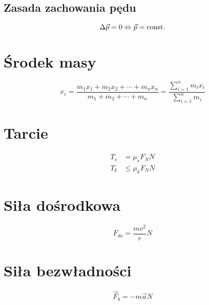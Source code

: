     \subsection{Zasada zachowania pędu}
      \begin{equation}
        \Delta \vec p = 0 \Leftrightarrow \vec p = \operatorname{const.}
      \end{equation}
    \section{Środek masy}
      \begin{equation}
        x_c = \frac{m_1x_1+m_2x_2+\cdots+m_nx_n}{m_1+m_2+\cdots+m_n} =
        \frac{\sum\limits_{i=1}^n m_ix_i}{\sum\limits_{i=1}^n m_i}
      \end{equation}
    \section{Tarcie}
      \begin{align}
        T_s &= \mu_sF_N \unit{N}\\
        T_k &\leqslant \mu_kF_N \unit{N}
      \end{align}
    \section{Siła dośrodkowa}
      \begin{equation}
        F_{do} = \frac{mv^2}{r} \unit{N}
      \end{equation}
      \section{Siła bezwładności}
      \begin{equation}
        \vec F_b = -m\vec a \unit{N}
      \end{equation}
